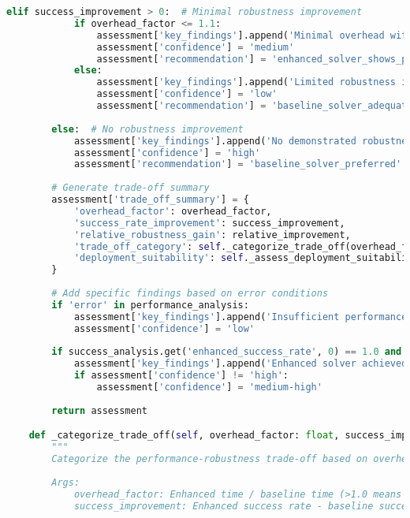 \begin{lstlisting}[language=Python, caption=Statistical Analysis and Comparison Framework]
        elif success_improvement > 0:  # Minimal robustness improvement
            if overhead_factor <= 1.1:
                assessment['key_findings'].append('Minimal overhead with slight robustness improvement')
                assessment['confidence'] = 'medium'
                assessment['recommendation'] = 'enhanced_solver_shows_promise'
            else:
                assessment['key_findings'].append('Limited robustness improvement may not justify overhead')
                assessment['confidence'] = 'low'
                assessment['recommendation'] = 'baseline_solver_adequate'
        
        else:  # No robustness improvement
            assessment['key_findings'].append('No demonstrated robustness advantage')
            assessment['confidence'] = 'high'
            assessment['recommendation'] = 'baseline_solver_preferred'
        
        # Generate trade-off summary
        assessment['trade_off_summary'] = {
            'overhead_factor': overhead_factor,
            'success_rate_improvement': success_improvement,
            'relative_robustness_gain': relative_improvement,
            'trade_off_category': self._categorize_trade_off(overhead_factor, success_improvement),
            'deployment_suitability': self._assess_deployment_suitability(overhead_factor, success_improvement)
        }
        
        # Add specific findings based on error conditions
        if 'error' in performance_analysis:
            assessment['key_findings'].append('Insufficient performance data for complete trade-off analysis')
            assessment['confidence'] = 'low'
        
        if success_analysis.get('enhanced_success_rate', 0) == 1.0 and success_analysis.get('baseline_success_rate', 0) < 1.0:
            assessment['key_findings'].append('Enhanced solver achieved 100% success rate - critical robustness advantage')
            if assessment['confidence'] != 'high':
                assessment['confidence'] = 'medium-high'
        
        return assessment

    def _categorize_trade_off(self, overhead_factor: float, success_improvement: float) -> str:
        """
        Categorize the performance-robustness trade-off based on overhead and robustness gains.
        
        Args:
            overhead_factor: Enhanced time / baseline time (>1.0 means slower)
            success_improvement: Enhanced success rate - baseline success rate
            

\end{lstlisting}
